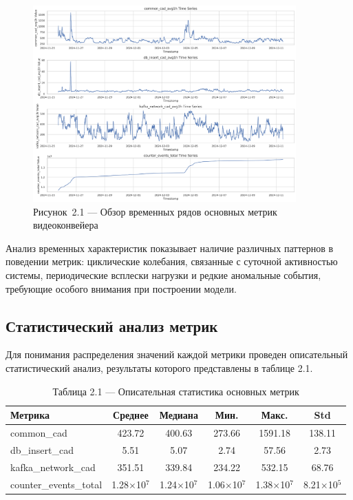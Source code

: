 \begin{figure}[H]
	\centering
	\includegraphics[width=0.9\textwidth]{figures/chapter2/time_series_overview.png}
	\caption*{Рисунок~2.1 --- Обзор временных рядов основных метрик видеоконвейера}
	\label{fig:time_series_overview}
\end{figure}

\hspace*{1.25cm}Анализ временных характеристик показывает наличие различных паттернов в поведении метрик: циклические колебания, связанные с суточной активностью системы, периодические всплески нагрузки и редкие аномальные события, требующие особого внимания при построении модели.

\subsection{Статистический анализ метрик}

\hspace*{1.25cm}Для понимания распределения значений каждой метрики проведен описательный статистический анализ, результаты которого представлены в таблице 2.1.

\begin{table}[H]
	\centering
	\caption*{Таблица 2.1 --- Описательная статистика основных метрик}
	\begin{tabular}{|l|c|c|c|c|c|}
		\hline
		\textbf{Метрика} & \textbf{Среднее} & \textbf{Медиана} & \textbf{Мин.} & \textbf{Макс.} & \textbf{Std} \\
		\hline
		common\_cad & 423.72 & 400.63 & 273.66 & 1591.18 & 138.11 \\
		db\_insert\_cad & 5.51 & 5.07 & 2.74 & 57.56 & 2.73 \\
		kafka\_network\_cad & 351.51 & 339.84 & 234.22 & 532.15 & 68.76 \\
		counter\_events\_total & 1.28$\times$10$^{7}$ & 1.24$\times$10$^{7}$ & 1.06$\times$10$^{7}$ & 1.38$\times$10$^{7}$ & 8.21$\times$10$^{5}$ \\
		\hline
	\end{tabular}
	\label{tab:descriptive_stats}
\end{table}

